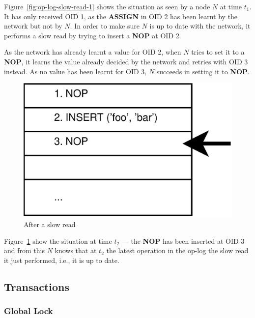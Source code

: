 \documentclass[12pt,twoside,notitlepage]{report}
\newcommand{\op}[1]  {{\bf #1}}         %
\begin{document}
Figure~\ref{fig:op-log-slow-read-1} shows the situation as seen by a node $N$ at time $t_1$. It
has only received OID 1, as the \op{ASSIGN} in OID 2 has been learnt by the network but not by
$N$. In order to make sure $N$ is up to date with the network, it performs a slow read by trying
to insert a \op{NOP} at OID 2.

As the network has already learnt a value for OID 2, when $N$ tries to set it to a \op{NOP}, it
learns the value already decided by the network and retries with OID 3 instead. As no value has
been learnt for OID 3, $N$ succeeds in setting it to \op{NOP}.

\begin{figure}[htb]
\centering
\includegraphics[scale=0.5]{figs/op-log-slow-read-2.eps}
\caption{\label{fig:op-log-slow-read-2}After a slow read}
\end{figure}

Figure~\ref{fig:op-log-slow-read-2} show the situation at time $t_2$ --- the \op{NOP} has been
inserted at OID 3 and from this $N$ knows that at $t_2$ the latest operation in the op-log the
slow read it just performed, i.e., it is up to date.

\subsection{Transactions}

\subsubsection{Global Lock}
\end{document}
